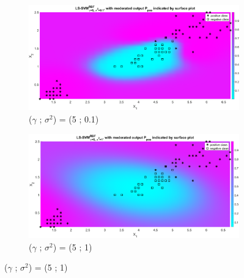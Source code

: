 { \begin{figure}[!htbp] 
	\centering
	\begin{subfigure}{.33\textwidth}
		\centering
		\includegraphics[height=0.8\linewidth,width=1\linewidth]{Exercise1/Report/Ex1.3.4_gam5_sig0.1.eps}
		\caption{($\gamma$ ; $\sigma^2$) = (5 ; 0.1)}
		\label{fig:gam5_sig0.1}
	\end{subfigure}%
	\begin{subfigure}{.33\textwidth}
		\centering
		\includegraphics[height=0.8\linewidth,width=1\linewidth]{Exercise1/Report/Ex1.3.4_gam5_sig1.eps}
		\caption{($\gamma$ ; $\sigma^2$) = (5 ; 1)}

\end{subfigure}
\end{figure}}
